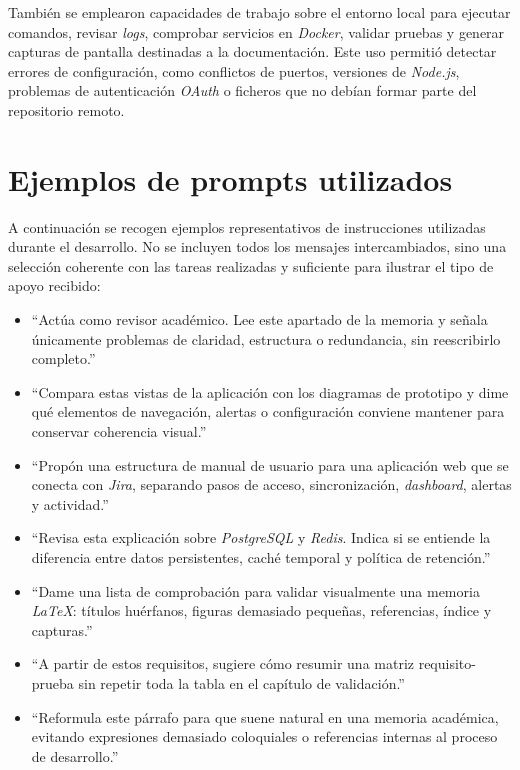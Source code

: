 \begin{refsection}
También se emplearon capacidades de trabajo sobre el entorno local para ejecutar comandos, revisar \textit{logs}, comprobar servicios en \textit{Docker}, validar pruebas y generar capturas de pantalla destinadas a la documentación. Este uso permitió detectar errores de configuración, como conflictos de puertos, versiones de \textit{Node.js}, problemas de autenticación \textit{OAuth} o ficheros que no debían formar parte del repositorio remoto.

\section{Ejemplos de prompts utilizados}

A continuación se recogen ejemplos representativos de instrucciones utilizadas durante el desarrollo. No se incluyen todos los mensajes intercambiados, sino una selección coherente con las tareas realizadas y suficiente para ilustrar el tipo de apoyo recibido:

\begin{itemize}
    \item ``Actúa como revisor académico. Lee este apartado de la memoria y señala únicamente problemas de claridad, estructura o redundancia, sin reescribirlo completo.''
    \item ``Compara estas vistas de la aplicación con los diagramas de prototipo y dime qué elementos de navegación, alertas o configuración conviene mantener para conservar coherencia visual.''
    \item ``Propón una estructura de manual de usuario para una aplicación web que se conecta con \textit{Jira}, separando pasos de acceso, sincronización, \textit{dashboard}, alertas y actividad.''
    \item ``Revisa esta explicación sobre \textit{PostgreSQL} y \textit{Redis}. Indica si se entiende la diferencia entre datos persistentes, caché temporal y política de retención.''
    \item ``Dame una lista de comprobación para validar visualmente una memoria \textit{LaTeX}: títulos huérfanos, figuras demasiado pequeñas, referencias, índice y capturas.''
    \item ``A partir de estos requisitos, sugiere cómo resumir una matriz requisito-prueba sin repetir toda la tabla en el capítulo de validación.''
    \item ``Reformula este párrafo para que suene natural en una memoria académica, evitando expresiones demasiado coloquiales o referencias internas al proceso de desarrollo.''
\end{itemize}


\end{refsection}
